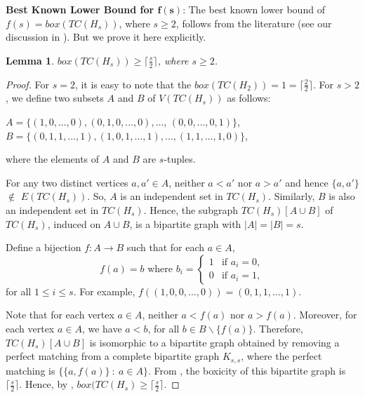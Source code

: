 \documentclass[twoside, 11pt]{article}
\newtheorem{lemma}{Lemma}
\newcommand{\TCH}[1]{TC(H_ {#1})}
\newcommand{\ceil}[1]{\lceil #1 \rceil}
\begin{document}
\vspace{0.2cm}

\noindent \textbf{Best Known Lower Bound  for $\mathbf{f(s)}$}: The best known lower bound  of $f(s)= box(\TCH{s})$, where $s \geq 2$, follows from the literature (see our discussion in ). But we prove it here explicitly.



\begin{lemma}\label{lower bound for boxicity of hypercube} $box(TC(H_s)) \geq \ceil{\frac{s}{2}}$, where $s \geq 2$.
\end{lemma}


\begin{proof}
    For $s=2$, it is easy to note that the $box(TC(H_2))=1=\ceil{\frac{2}{2}}$. For $s>2$, we define two subsets $A$ and $B$ of $V(TC(H_s))$ as follows:
    \begin{center}
        $A =\{(1,0,\dots,0), (0,1,0,\dots,0),\dots$, $(0,0,\dots,0,1)\}$,\\
        $B =\{(0,1,1,\dots,1),$$(1,0,1,\dots,1),\dots,(1,1,\dots,1,0)\}$,
    \end{center} where the elements of $A$ and $B$ are $s$-tuples. 
    
    For any two distinct vertices $a, a' \in A$, neither $a < a'$ nor $a > a'$ and hence $\{a, a'\}$ $\notin$ $E(TC(H_s))$. So, $A$ is an independent set in $TC(H_s)$. Similarly, $B$ is also an independent set in $TC(H_s)$. Hence, the subgraph $TC(H_s)[A \cup B]$ of $TC(H_s)$, induced on $A\cup B$, is a bipartite graph with $|A| = |B| = s$. 

    Define a bijection $f : A \to B$ such that for each $a \in A$,  
\[
f(a) = b \text{ where } b_i = 
\begin{cases} 
1 & \text{if } a_i = 0, \\ 
0 & \text{if } a_i = 1,
\end{cases}
\]
for all $1 \leq i \leq s$. For example, $f((1, 0, 0, \dots, 0)) = (0, 1, 1, \dots, 1)$.
    
    Note that for each vertex $a \in A$, neither $a < f(a)$ nor $a > f(a)$. Moreover, for each vertex $a \in A$, we have $a < b$, for all $b \in B\backslash\{f(a)\}$. Therefore, $TC(H_s)[A \cup B]$ is isomorphic to a bipartite graph obtained by removing a perfect matching from a complete bipartite graph $K_{s,s}$, where the perfect matching is $\{\{a, f(a)\} \ : \ a \in A\}$. From \cite{chandran2009cubicity}, the boxicity of this bipartite graph is $\ceil{\frac{s}{2}}$. Hence, by , $box(TC(H_s) \geq \ceil{\frac{s}{2}}$.
 \end{proof}
\end{document}
